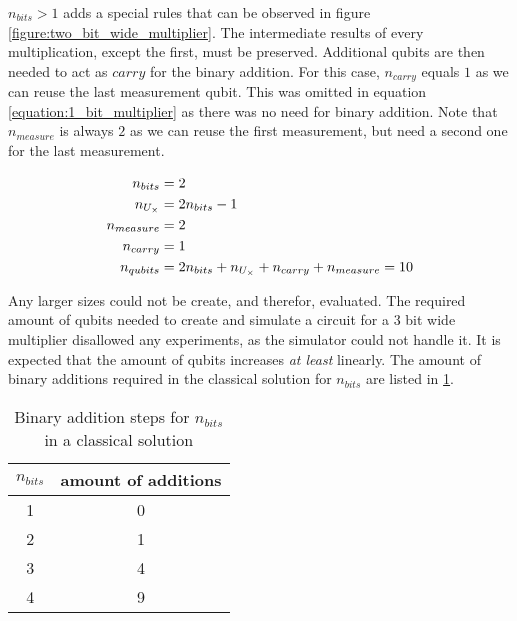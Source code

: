 $n_{bits} > 1$ adds a special rules that can be observed in figure \ref{figure:two_bit_wide_multiplier}. The intermediate results of every multiplication, except the first, must be preserved. Additional qubits are then needed to act as $carry$ for the binary addition. For this case, $n_{carry}$ equals $1$ as we can reuse the last measurement qubit. This was omitted in equation \ref{equation:1_bit_multiplier} as there was no need for binary addition. Note that $n_{measure}$ is always $2$ as we can reuse the first measurement, but need a second one for the last measurement.

\begin{equation}\label{equation:2_bit_multiplier}
\centering
    \begin{split}
        n_{bits} &= 2 \\
        n_{U_{\times}} &= 2n_{bits} -1 \\
        n_{measure} &= 2\\
        n_{carry} &= 1\\
        n_{qubits} &= 2n_{bits} + n_{U_{\times}} + n_{carry} + n_{measure} = 10
    \end{split}
\end{equation}

Any larger sizes could not be create, and therefor, evaluated. The required amount of qubits needed to create and simulate a circuit for a $3$ bit wide multiplier disallowed any experiments, as the  simulator could not handle it. It is expected that the amount of qubits increases \emph{at least} linearly. The amount of binary additions required in the classical solution for $n_{bits}$ are listed in \ref{table:amount_addition_binary_multiplication}.

\begin{table}[!h]
    \centering
    \begin{tabular}{|c|c|}
    \hline
    $n_{bits}$ & amount of additions \\ \hline
    1          & 0                   \\ \hline
    2          & 1                   \\ \hline
    3          & 4                   \\ \hline
    4          & 9                   \\ \hline
    \end{tabular}
    \caption{Binary addition steps for $n_{bits}$ in a classical solution}
    \label{table:amount_addition_binary_multiplication}
\end{table}


